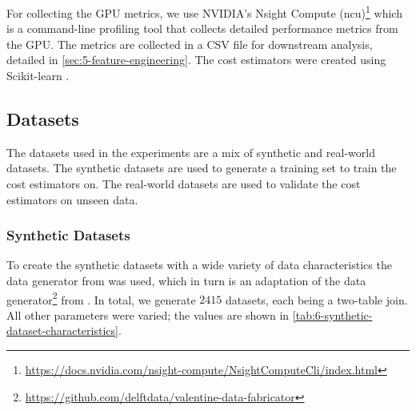 For collecting the GPU metrics, we use NVIDIA's Nsight Compute (ncu)\footnote{\url{https://docs.nvidia.com/nsight-compute/NsightComputeCli/index.html}} which is a command-line profiling tool that collects detailed performance metrics from the GPU. The metrics are collected in a CSV file for downstream analysis, detailed in \autoref{sec:5-feature-engineering}. The cost estimators were created using Scikit-learn \cite{scikit-learn}.

\subsection{Datasets}
\label{subsec:6-datasets}
The datasets used in the experiments are a mix of synthetic and real-world datasets. The synthetic datasets are used to generate a training set to train the cost estimators on. The real-world datasets are used to validate the cost estimators on unseen data.

\subsubsection{Synthetic Datasets}
To create the synthetic datasets with a wide variety of data characteristics the data generator from \cite{schijndel_cost_estimation} was used, which in turn is an adaptation of the data generator\footnote{\url{https://github.com/delftdata/valentine-data-fabricator}} from \cite{valentine-data-generator}. In total, we generate $2415$ datasets, each being a two-table join. All other parameters were varied; the values are shown in \autoref{tab:6-synthetic-dataset-characteristics}.

